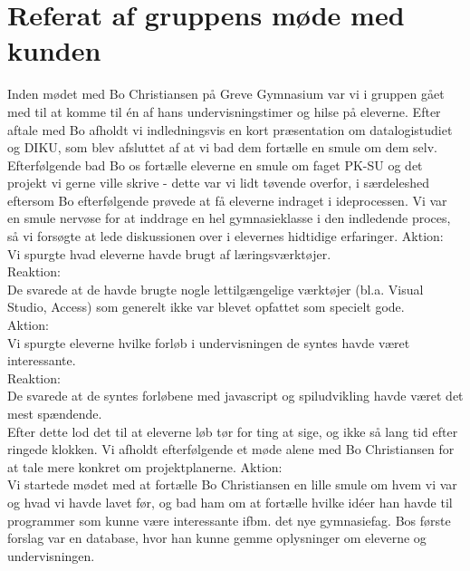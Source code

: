 \documentclass[10pt,a4paper,danish]{article}
\begin{document}
\section{Referat af gruppens møde med kunden}
Inden mødet med Bo Christiansen på Greve Gymnasium var vi i gruppen gået med til at komme til én af hans undervisningstimer og hilse på eleverne. Efter aftale med Bo afholdt vi indledningsvis en kort præsentation om datalogistudiet og DIKU, som blev afsluttet af at vi bad dem fortælle en smule om dem selv. Efterfølgende bad Bo os fortælle eleverne  en smule om faget PK-SU og det projekt vi gerne ville skrive - dette var vi lidt tøvende overfor, i særdeleshed eftersom Bo efterfølgende prøvede at få eleverne indraget i ideprocessen. Vi var en smule nervøse for at inddrage en hel gymnasieklasse i den indledende proces, så vi forsøgte at lede diskussionen over i elevernes hidtidige erfaringer.
\newline
\newline
Aktion:\\
Vi spurgte hvad eleverne havde brugt af læringsværktøjer.\\
\newline
Reaktion:\\
De svarede at de havde brugte nogle lettilgængelige værktøjer (bl.a. Visual Studio, Access) som generelt ikke var blevet opfattet som specielt gode.\\
\newline
Aktion:\\
Vi spurgte eleverne hvilke forløb i undervisningen de syntes havde været interessante.\\
\newline
Reaktion:\\
De svarede at de syntes forløbene med javascript og spiludvikling havde været det mest spændende.\\
\newline
Efter dette lod det til at eleverne løb tør for ting at sige, og ikke så lang tid efter ringede klokken. Vi afholdt efterfølgende et møde alene med Bo Christiansen for at tale mere konkret om projektplanerne.
\newline
\newline
Aktion:\\
Vi startede mødet med at fortælle Bo Christiansen en lille smule om hvem vi var og hvad vi havde lavet før, og bad ham om at fortælle hvilke idéer han havde til programmer som kunne være interessante ifbm. det nye gymnasiefag. 
\newline
Bos første forslag var en database, hvor han kunne gemme oplysninger om eleverne og undervisningen.\\
\end{document}
